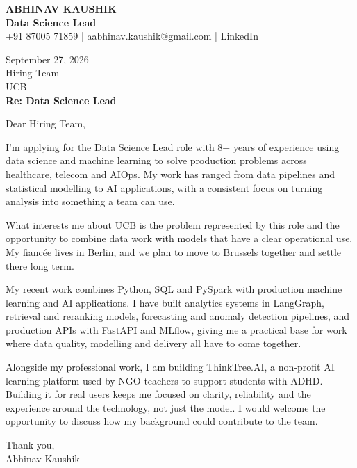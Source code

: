 \documentclass[10pt,a4paper]{article}
\begin{document}
\begin{center}
{\Large\bfseries ABHINAV KAUSHIK}\\[2pt]
{\bfseries Data Science Lead}\\[2pt]
+91 87005 71859 \quad | \quad aabhinav.kaushik@gmail.com \quad | \quad LinkedIn
\end{center}
\vspace{8pt}
September 27, 2026\\[6pt]
Hiring Team\\
UCB\\[4pt]
\textbf{Re: Data Science Lead}

Dear Hiring Team,

I’m applying for the Data Science Lead role with 8+ years of experience using data science and machine learning to solve production problems across healthcare, telecom and AIOps. My work has ranged from data pipelines and statistical modelling to AI applications, with a consistent focus on turning analysis into something a team can use.

What interests me about UCB is the problem represented by this role and the opportunity to combine data work with models that have a clear operational use. My fiancée lives in Berlin, and we plan to move to Brussels together and settle there long term.

My recent work combines Python, SQL and PySpark with production machine learning and AI applications. I have built analytics systems in LangGraph, retrieval and reranking models, forecasting and anomaly detection pipelines, and production APIs with FastAPI and MLflow, giving me a practical base for work where data quality, modelling and delivery all have to come together.

Alongside my professional work, I am building ThinkTree.AI, a non-profit AI learning platform used by NGO teachers to support students with ADHD. Building it for real users keeps me focused on clarity, reliability and the experience around the technology, not just the model. I would welcome the opportunity to discuss how my background could contribute to the team.

Thank you,\\
Abhinav Kaushik
\end{document}
